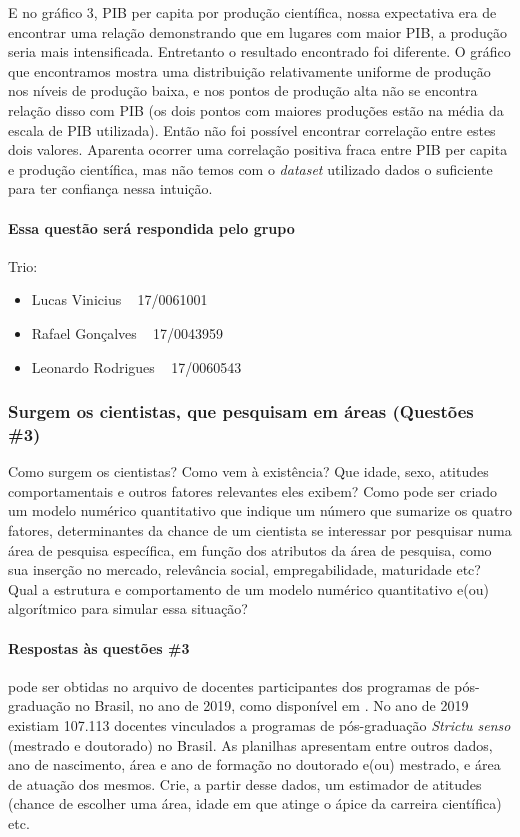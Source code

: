 E no gráfico 3, PIB per capita por produção científica, nossa expectativa era de encontrar uma relação demonstrando que em lugares com maior PIB, a produção seria mais intensificada. Entretanto o resultado encontrado foi diferente. O gráfico que encontramos mostra uma distribuição relativamente uniforme de produção nos níveis de produção baixa, e nos pontos de produção alta não se encontra relação disso com PIB (os dois pontos com maiores produções estão na média da escala de PIB utilizada). Então não foi possível encontrar correlação entre estes dois valores. Aparenta ocorrer uma correlação positiva fraca entre PIB per capita e produção científica, mas não temos com o \textit{dataset} utilizado dados o suficiente para ter confiança nessa intuição.

\paragraph{Essa questão será respondida pelo grupo} Trio:
\begin{itemize}
    \item Lucas Vinicius ~ 17/0061001
    \item Rafael Gonçalves ~ 17/0043959
    \item Leonardo Rodrigues ~ 17/0060543
\end{itemize}

\subsubsection{Surgem os cientistas, que pesquisam em áreas (Questões \#3)} 
Como surgem os cientistas? Como vem à existência? Que idade, sexo, atitudes comportamentais e outros fatores relevantes eles exibem? Como pode ser criado um modelo numérico quantitativo que indique um número que sumarize os quatro fatores, determinantes da chance de um cientista se interessar por pesquisar numa área de pesquisa específica, em função dos atributos da área de pesquisa, como sua inserção no mercado, relevância social, empregabilidade, maturidade etc? Qual a estrutura e comportamento de um modelo numérico quantitativo e(ou) algorítmico para simular essa situação?

\paragraph{Respostas às questões \#3} pode ser obtidas no arquivo de docentes participantes dos programas de pós-graduação no Brasil, no ano de 2019, como disponível em \cite{capes_docentes_2020}. No ano de 2019 existiam 107.113 docentes vinculados a programas de pós-graduação \textit{Strictu senso} (mestrado e doutorado) no Brasil. As planilhas apresentam entre outros dados, ano de nascimento, área e ano de formação no doutorado e(ou) mestrado, e área de atuação dos mesmos.
Crie, a partir desse dados, um estimador de atitudes (chance de escolher uma área, idade em que atinge o ápice da carreira científica) etc.

